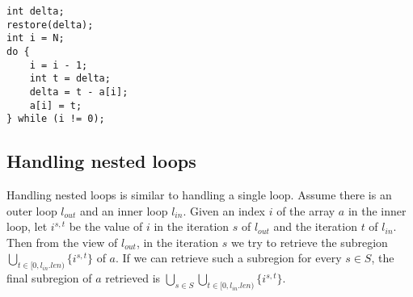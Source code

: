 \begin{lstlisting}
int delta;
restore(delta);
int i = N;
do {
    i = i - 1;
    int t = delta;
    delta = t - a[i];
    a[i] = t;
} while (i != 0);
\end{lstlisting}

\begin{comment}

Assume at runtime the number of iterations of the loop is $n$.
Let $t$ be the loop index in the original loop, where $t\in [1:n]$.
For every value defined in the loop, we add $t$ to it as a superscript to show that value in the iteration $t$.

We acquire each element of $a_0$ from $a_1$ using the index $i_1^t$.
Assume during the loop, the subregion $R$ of the array $a$ is modified.
We add a summary edge between $a_0$ and $a_3$ with subregion $\overline{R}$ in which elements of $a$ stay unchanged.



In general, for an array updated in a loop, between the output of the iteration $t$ and the output of the loop for the array (in our example, $a_3$ and $a_4$ respectively), we add a subregion showing in which part of the array they have the same elements.
Let $I$ include all indices at which the array is modified in the loop (in our example, $I=\{i_1,j_2\}$).
Then at the end of the iteration $t$, the subregion of the array that will be modified during the following iterations is $R(t,n) = \bigcup_{i\in I}{\bigcup_{t\le r\le n}{\{i^r\}}}$.
Then $R=R(0)$.
At the beginning of the iterations $t$, the subregion on with $a_0$ and $a_1$ have the same elements is $R(0,t-1)$.

\end{comment}


\subsection{Handling nested loops}
Handling nested loops is similar to handling a single loop.
Assume there is an outer loop $l_{out}$ and an inner loop $l_{in}$.
Given an index $i$ of the array $a$ in the inner loop, let $i^{s,t}$ be the value of $i$ in the iteration $s$ of $l_{out}$ and the iteration $t$ of $l_{in}$.
Then from the view of $l_{out}$, in the iteration $s$ we try to retrieve the subregion $\bigcup_{t\in[0,l_{in}.len)}{\{i^{s,t}\}}$ of $a$.
If we can retrieve such a subregion for every $s\in S$, the final subregion of $a$ retrieved is $\bigcup_{s\in S}\bigcup_{t\in[0,l_{in}.len)}{\{i^{s,t}\}}$.


